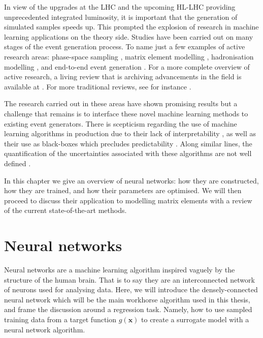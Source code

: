 \documentclass[main.tex]{subfiles}
\begin{document}
    In view of the upgrades at the LHC and the upcoming
    HL-LHC providing unprecedented integrated luminosity,
    it is important that the generation of simulated samples
    speeds up. This prompted the explosion of research
    in machine learning applications on the theory side.
    Studies have been carried out on many stages of the event
    generation process.
    To name just a few examples of active research areas:
    phase-space sampling \cite{Bendavid:2017zhk,Klimek:2018mza,Bothmann:2020ywa,Verheyen:2020bjw,Gao:2020vdv},
    matrix element modelling \cite{Bishara:2019iwh,Badger:2020uow,Aylett-Bullock:2021hmo,Maitre:2021uaa,Badger:2022hwf},
    hadronisation modelling \cite{Biro:2021zgm,Ilten:2022jfm,Ghosh:2022zdz},
    and end-to-end event generation \cite{Gao:2020zvv,DiSipio:2019imz,Butter:2019cae,Butter:2021csz,ArjonaMartinez:2019ahl}.
    For a more complete overview of active research,
    a living review that is archiving advancements in the
    field is available at \cite{Feickert:2021ajf}.
    For more traditional reviews, see for instance
    \cite{Guest:2018yhq,Radovic:2018dip,Butter:2022rso}.

    The research carried out in these areas have shown
    promising results but a challenge that remains
    is to interface these novel machine learning methods
    to existing event generators.
    There is scepticism regarding the use of machine learning
    algorithms in production due to their lack of interpretability \cite{Grojean:2022mef},
    as well as their use as black-boxes which precludes predictability \cite{Schwartz:2022njo}.
    Along similar lines, the quantification of the uncertainties
    associated with these algorithms are not well defined \cite{Chen:2022pzc}.

    In this chapter we give an overview of neural
    networks: how they are constructed, how
    they are trained, and how their parameters are optimised.
    We will then proceed to discuss their
    application to modelling matrix
    elements with a review of the current
    state-of-the-art methods.

\section{Neural networks}
    Neural networks are a machine learning algorithm
    inspired vaguely by the structure of the human brain.
    That is to say they are an interconnected network
    of neurons used for analysing data. Here, we will
    introduce the densely-connected neural network
    which will be the main workhorse algorithm used
    in this thesis, and frame the discussion around a
    regression task. Namely, how to use sampled training data
    from a target function $g(\mathbf{x})$ to create a surrogate
    model with a neural network algorithm.
\end{document}
